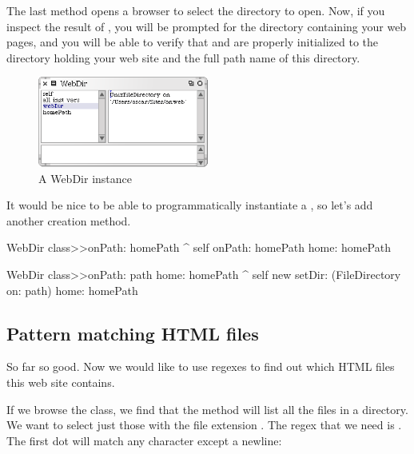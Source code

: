 \documentclass[a4paper,10pt,twoside]{book}
\begin{document}
The last method opens a browser to select the directory to open.
Now, if you inspect the result of , you will be prompted for the directory containing your web pages, and you will be able to verify that  and  are properly initialized to the directory holding your web site and the full path name of this directory.

\begin{figure}[tbh]
\begin{center}
\includegraphics[width=0.5\textwidth]{aWebDir}
\caption{A WebDir instance}
\label{fig:aWebDir}
\end{center}
\end{figure}

It would be nice to be able to programmatically instantiate a , so let's add another creation method.


\begin{code}{}
WebDir class>>onPath: homePath
	^ self onPath: homePath home: homePath

WebDir class>>onPath: path home: homePath
	^ self new setDir: (FileDirectory on: path) home: homePath
\end{code}

\subsection{Pattern matching HTML files}

So far so good.
Now we would like to use regexes to find out which HTML files this web site contains.

If we browse the  class, we find that the method  will list all the files in a directory. We want to select just those with the file extension . The regex that we need is . The first dot will match any character except a newline:
\end{document}
